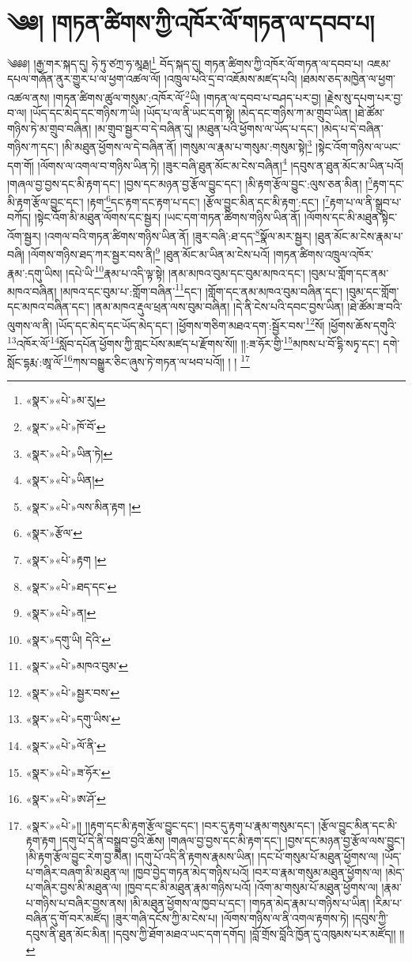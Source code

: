 \chapter{༄༅། །གཏན་ཚིགས་ཀྱི་འཁོར་ལོ་གཏན་ལ་དབབ་པ།}༄༅༅། །རྒྱ་གར་སྐད་དུ། ཧེ་ཏུ་ཙཀྲ་ཧ་མཱརྠ།\footnote{«སྣར་»«པེ་»མ་རུ།} བོད་སྐད་དུ། གཏན་ཚིགས་ཀྱི་འཁོར་ལོ་གཏན་ལ་དབབ་པ། འཇམ་དཔལ་གཞོན་ནུར་གྱུར་པ་ལ་ཕྱག་འཚལ་ལོ། །འཁྲུལ་པའི་དྲ་བ་འཇོམས་མཛད་པའི། །ཐམས་ཅད་མཁྱེན་ལ་ཕྱག་འཚལ་ནས། །གཏན་ཚིགས་ཚུལ་གསུམ་:འཁོར་ལོ་\footnote{«སྣར་»«པེ་»ཁོ་བོ་}ཡི། །གཏན་ལ་དབབ་པ་བཤད་པར་བྱ། །རྗེས་སུ་དཔག་པར་བྱ་བ་ལ། །ཡོད་དང་མེད་དང་གཉིས་ཀ་ཡི། །ཡོད་པ་ལ་ནི་ཡང་དག་སྟེ། །མེད་དང་གཉིས་ཀ་མ་གྲུབ་ཡིན། །ཐེ་ཚོམ་གཉིས་ཏེ་མ་གྲུབ་བཞིན། །མ་གྲུབ་སྦྱར་བ་དེ་བཞིན་དུ། །མཐུན་པའི་ཕྱོགས་ལ་ཡོད་པ་དང་། །མེད་པ་དེ་བཞིན་གཉིས་ཀ་དང་། །མི་མཐུན་ཕྱོགས་ལ་དེ་བཞིན་ནོ། །གསུམ་ལ་རྣམ་པ་གསུམ་:གསུམ་སྟེ།\footnote{«སྣར་»«པེ་»ཡིན་ཏེ།} །སྟེང་འོག་གཉིས་ལ་ཡང་དག་གོ། །ལོགས་ལ་འགལ་བ་གཉིས་ཡིན་ཏེ། །ཟུར་བཞི་ཐུན་མོང་མ་ངེས་བཞིན།\footnote{«སྣར་»«པེ་»ཡིན།} །དབུས་ན་ཐུན་མོང་མ་ཡིན་པའོ། །གཞལ་བྱ་བྱས་དང་མི་རྟག་དང་། །བྱས་དང་མཉན་བྱ་རྩོལ་བྱུང་དང་། །མི་རྟག་རྩོལ་བྱུང་:ལུས་ཅན་མིན། །\footnote{«སྣར་»«པེ་»ལས་མིན་རྟག །}རྟག་དང་མི་རྟག་རྩོལ་བྱུང་དང་། །རྟག་\footnote{«སྣར་»རྩོལ་}དང་རྟག་དང་རྟག་པ་དང་། །རྩོལ་བྱུང་མིན་དང་མི་རྟག་:དང་། །\footnote{«སྣར་»«པེ་»རྟག །}རྟག་པ་ལ་ནི་སྒྲུབ་པ་བཀོད། །སྟེང་འོག་མི་མཐུན་ལོགས་དང་སྦྱར། །ཡང་དག་གཏན་ཚིགས་གཉིས་ཡིན་ནོ། །ལོགས་དང་མི་མཐུན་སྟེང་འོག་སྦྱར། །འགལ་བའི་གཏན་ཚིགས་གཉིས་ཡིན་ནོ། །ཟུར་བཞི་:ཐ་དད་\footnote{«སྣར་»«པེ་»ཐད་དང་}སྣོལ་མར་སྦྱར། །ཐུན་མོང་མ་ངེས་རྣམ་པ་བཞི། །ལོགས་གཉིས་ཐད་ཀར་སྦྱར་བས་ནི།\footnote{«སྣར་»«པེ་»ན།} །ཐུན་མོང་མ་ཡིན་མ་ངེས་པའོ། །གཏན་ཚིགས་འཁྲུལ་འཁོར་རྣམ་:དགུ་ཡིས། །དཔེ་ཡི་\footnote{«སྣར་»དགུ་ཡི། དེའི་}རྣམ་པ་འདི་ལྟ་སྟེ། །ནམ་མཁའ་བུམ་དང་བུམ་མཁའ་དང་། །བུམ་པ་གློག་དང་ནམ་མཁའ་བཞིན། །མཁའ་དང་བུམ་པ་:གློག་བཞིན་\footnote{«སྣར་»«པེ་»མཁའ་བུམ་}དང་། །གློག་དང་ནམ་མཁའ་བུམ་བཞིན་དང་། །བུམ་དང་གློག་དང་མཁའ་བཞིན་དང་། །ནམ་མཁའ་རྡུལ་ཕྲན་ལས་བུམ་བཞིན། །དེ་ནི་ངེས་པའི་དབང་བྱས་ཡིན། །ཐེ་ཚོམ་ཟ་བའི་ལུགས་ལ་ནི། །ཡོད་དང་མེད་དང་ཡོད་མེད་དང་། །ཕྱོགས་གཅིག་མཐའ་དག་:སྦྱོར་བས་\footnote{«སྣར་»«པེ་»སྦྱར་བས་}སོ། །ཕྱོགས་ཆོས་དགུའི་\footnote{«སྣར་»«པེ་»དགུ་ཡིས་}འཁོར་ལོ་\footnote{«སྣར་»«པེ་»ལོ་ནི་}སློབ་དཔོན་ཕྱོགས་ཀྱི་གླང་པོས་མཛད་པ་རྫོགས་སོ།། །།:ཟ་ཧོར་གྱི་\footnote{«སྣར་»«པེ་»ཟ་ཧོར་}མཁས་པ་བོ་དྷི་སཏྭ་དང་། དགེ་སློང་དྷརྨ་:ཨཱ་ལོ་\footnote{«སྣར་»«པེ་»ཨ་ཤོ་}ཀས་བསྒྱུར་ཅིང་ཞུས་ཏེ་གཏན་ལ་ཕབ་པའོ།། །
། \footnote{«སྣར་»«པེ་»།། །།རྟག་དང་མི་རྟག་རྩོལ་བྱུང་དང་། །བར་དུ་རྟག་པ་རྣམ་གསུམ་དང་། །རྩོལ་བྱུང་མིན་དང་མི་རྟག་རྟག །དགུ་པོ་དེ་ནི་བསྒྲུབ་བྱའི་ཆོས། །གཞལ་བྱ་བྱས་དང་མི་རྟག་དང་། །བྱས་དང་མཉན་བྱ་རྩོལ་ལས་བྱུང་། །མི་རྟག་རྩོལ་བྱུང་རེག་བྱ་མིན། །དགུ་པོ་འདི་ནི་རྟགས་རྣམས་ཡིན། །དང་པོ་གསུམ་པོ་མཐུན་ཕྱོགས་ལ། །ཡོད་པ་གཞིར་བཞག་མི་མཐུན་ལ། །ཁྱབ་བྱེད་གཏན་མེད་གཉིས་པའོ། །བར་བ་རྣམ་གསུམ་མཐུན་ཕྱོགས་ལ། །མེད་པ་གཞིར་བྱས་མི་མཐུན་ལ། །ཁྱབ་དང་མི་མཐུན་རྣམ་གཉིས་པའོ། །འོག་མ་གསུམ་པོ་མཐུན་ཕྱོགས་ལ། །རྣམ་པ་གཉིས་པ་བཞིར་བྱས་ནས། །མི་མཐུན་ཕྱོགས་ལ་ཁྱབ་པ་དང་། །གཏན་མེད་རྣམ་པ་གཉིས་པ་ཡིན། །རིམ་པ་བཞིན་དུ་གོ་བར་མཛོད། །ཟུར་གཞི་དངོས་ཀྱི་མ་ངེས་པ། །ལོགས་གཉིས་ལ་ནི་འགལ་རྟགས་ཏེ། །དབུས་ཀྱི་དབུས་ནི་ཐུན་མོང་མིན། །དབུས་ཀྱི་ཐོག་མཐའ་ཡང་དག་དགོད། །བློ་གྲོས་བློའི་ཁྱོན་དུ་འཁུམས་པར་མཛོད།། །། }